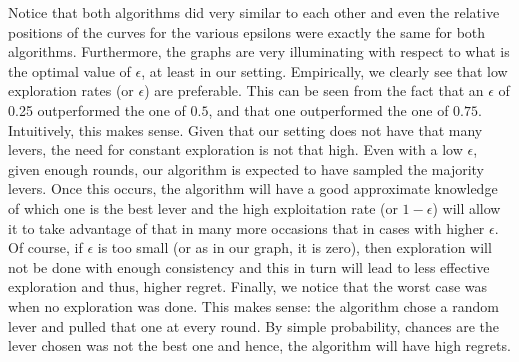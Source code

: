 \documentclass[12pt]{article}
\begin{document}
Notice that both algorithms did very similar to each other and even the relative positions of the curves for the various epsilons were exactly the same for both algorithms. Furthermore, the graphs are very illuminating with respect to what is the optimal value of $\epsilon$, at least in our setting. Empirically, we clearly see that low exploration rates (or $\epsilon$) are preferable. This can be seen from the fact that an $\epsilon$ of 0.25 outperformed the one of $0.5$, and that one outperformed the one of $0.75$. Intuitively, this makes sense. Given that our setting does not have that many levers, the need for constant exploration is not that high. Even with a low $\epsilon$, given enough rounds, our algorithm is expected to have sampled the majority levers. Once this occurs, the algorithm will have a good approximate knowledge of which one is the best lever and the high exploitation rate (or $1-\epsilon$) will allow it to take advantage of that in many more occasions that in cases with higher $\epsilon$. Of course, if $\epsilon$ is too small (or as in our graph, it is zero), then exploration will not be done with enough consistency and this in turn will lead to less effective exploration and thus, higher regret. Finally, we notice that the worst case was when no exploration was done. This makes sense: the algorithm chose a random lever and pulled that one at every round. By simple probability, chances are the lever chosen was not the best one and hence, the algorithm will have high regrets. 
\end{document}
